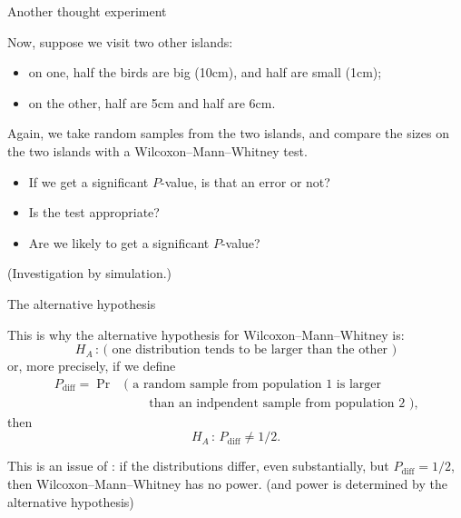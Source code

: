 \begin{frame}{Another thought experiment}

  Now, suppose we visit two other islands:
  \begin{itemize}
    \item on one, half the birds are big (10cm), and half are small (1cm);
    \item on the other, half are 5cm and half are 6cm.
  \end{itemize}

  \vspace{2em}

  Again, we take random samples from the two islands,
  and compare the sizes on the two islands with a Wilcoxon--Mann--Whitney test.
  \begin{itemize}
    \item If we get a significant $P$-value, is that an error or not?
    \item Is the test appropriate?
    \item Are we likely to get a significant $P$-value?
  \end{itemize}

  \vspace{2em}
  \pause

  (Investigation by simulation.)

\end{frame}

\begin{frame}{The alternative hypothesis}

  This is why the alternative hypothesis for Wilcoxon--Mann--Whitney is:
  \[  H_A \, : \, \text{( one distribution tends to be larger than the other )} \]
  or, more precisely, if we define
  \begin{align*}
    P_\text{diff} = \Pr & \text{( a random sample from population 1 is larger} \\
      & \qquad \text{than an indpendent sample from population 2 )} , 
  \end{align*}
  then
  \[  H_A \, : \, P_\text{diff} \neq 1/2 .\]

  \vspace{2em}

  This is an issue of :
  if the distributions differ, even substantially,
  but $P_\text{diff}=1/2$,
  then Wilcoxon--Mann--Whitney has \alert{no power}.
  (and power is determined by the alternative hypothesis)

\end{frame}


